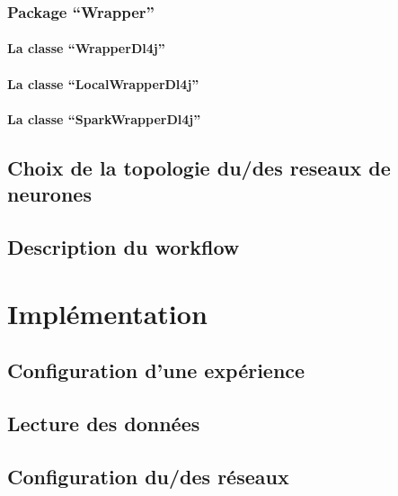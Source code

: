 \documentclass[a4paper,10pt,openany,oneside]{sphinxmanual}
\begin{document}
\subsection{Package ``Wrapper''}
\label{index:package-wrapper}

\subsubsection{La classe ``WrapperDl4j''}
\label{index:la-classe-wrapperdl4j}

\subsubsection{La classe ``LocalWrapperDl4j''}
\label{index:la-classe-localwrapperdl4j}

\subsubsection{La classe ``SparkWrapperDl4j''}
\label{index:la-classe-sparkwrapperdl4j}

\section{Choix de la topologie du/des reseaux de neurones}
\label{index:choix-de-la-topologie-du-des-reseaux-de-neurones}

\section{Description du workflow}
\label{index:description-du-workflow}

\chapter{Implémentation}
\label{index:implementation}

\section{Configuration d'une expérience}
\label{index:configuration-d-une-experience}

\section{Lecture des données}
\label{index:lecture-des-donnees}

\section{Configuration du/des réseaux}
\label{index:configuration-du-des-reseaux}
\end{document}
